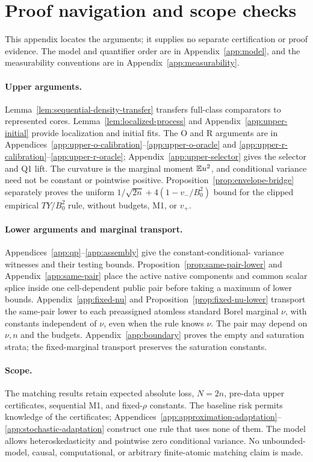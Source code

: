 \section{Proof navigation and scope checks}
\label{app:audit}

This appendix locates the arguments; it supplies no separate certification
or proof evidence.  The model and quantifier order are in
Appendix~\ref{app:model}, and the measurability conventions are in
Appendix~\ref{app:measurability}.

\paragraph{Upper arguments.}
Lemma~\ref{lem:sequential-density-transfer} transfers full-class comparators
to represented cores.  Lemma~\ref{lem:localized-process} and
Appendix~\ref{app:upper-initial} provide localization and initial fits.
The O and R arguments are in
Appendices~\ref{app:upper-o-calibration}--\ref{app:upper-o-oracle} and
\ref{app:upper-r-calibration}--\ref{app:upper-r-oracle};
Appendix~\ref{app:upper-selector} gives the selector and Q1 lift.
The curvature is the marginal moment \(\mathbb E u^2\), and conditional variance
need not be constant or pointwise positive.
Proposition~\ref{prop:envelope-bridge} separately proves the uniform
\(1/\sqrt{2n}+4(1-v_-/B_0^2)\) bound for the clipped empirical
\(TY/B_0^2\) rule, without budgets, M1, or \(v_+\).

\paragraph{Lower arguments and marginal transport.}
Appendices~\ref{app:qp}--\ref{app:assembly} give the constant-conditional-
variance witnesses and their testing bounds.  Proposition~\ref{prop:same-pair-lower}
and Appendix~\ref{app:same-pair} place the active native components and
common scalar splice inside one cell-dependent public pair before taking
a maximum of lower bounds.
Appendix~\ref{app:fixed-nu} and Proposition~\ref{prop:fixed-nu-lower}
transport the same-pair lower to each preassigned atomless standard Borel
marginal \(\nu\), with constants independent of \(\nu\), even when the
rule knows \(\nu\).  The pair may depend on \(\nu,n\) and the budgets.
Appendix~\ref{app:boundary} proves the empty and saturation strata; the
fixed-marginal transport preserves the saturation constants.

\paragraph{Scope.}
The matching results retain expected absolute loss, \(N=2n\),
pre-data upper certificates, sequential M1, and fixed-\(\rho\) constants.
The baseline risk permits knowledge of the certificates;
Appendices~\ref{app:approximation-adaptation}--\ref{app:stochastic-adaptation}
construct one rule that uses none of them. The model allows
heteroskedasticity and pointwise zero conditional variance.
No unbounded-model, causal, computational, or arbitrary
finite-atomic matching claim is made.
